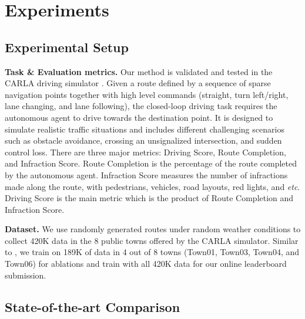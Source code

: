 \documentclass{article}
\begin{document}
\section{Experiments} \label{sec:exp}
\subsection{Experimental Setup} \label{sec:exp_setup}
\textbf{Task \& Evaluation metrics.}
Our method is validated and tested in the CARLA driving simulator \citep{Dosovitskiy17carla}. Given a route defined by a sequence of sparse navigation points together with high level commands (straight, turn left/right, lane changing, and lane following), the closed-loop driving task requires the autonomous agent to drive towards the destination point. It is designed to simulate realistic traffic situations and includes different challenging scenarios such as obstacle avoidance, crossing an unsignalized intersection, and sudden control loss.
There are three major metrics: Driving Score, Route Completion, and Infraction Score. Route Completion is the percentage of the route completed by the autonomous agent. Infraction Score measures the number of infractions made along the route, with pedestrians, vehicles, road layouts, red lights, and \textit{etc}. Driving Score is the main metric which is the product of Route Completion and Infraction Score.

\textbf{Dataset.}
We use randomly generated routes under random weather conditions to collect 420K data in the 8 public towns offered by the CARLA simulator. Similar to \citep{chen2022lav}, we train \algname on 189K of data in 4 out of 8 towns (Town01, Town03, Town04, and Town06) for ablations and train with all 420K data for our online leaderboard submission.



\subsection{State-of-the-art Comparison} \label{sec:exp_comparison}
\end{document}
